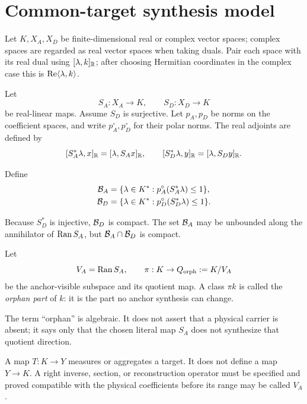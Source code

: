 \section{Common-target synthesis model}
\label{sec:setup}

Let \(K,X_A,X_D\) be finite-dimensional real or complex vector spaces;
complex spaces are regarded as real vector spaces when taking duals.
Pair each space with its real dual using \([\lambda,k]_{\mathbb R}\); after
choosing Hermitian coordinates in the complex case this is
\(\operatorname{Re}\langle\lambda,k\rangle\).

Let
\[
 S_A:X_A\to K,
 \qquad
 S_D:X_D\to K
\]
be real-linear maps.  Assume \(S_D\) is surjective.  Let \(p_A,p_D\)
be norms on the coefficient spaces, and write \(p_A^\circ,p_D^\circ\)
for their polar norms.  The real adjoints are defined by
\[
 [S_A^*\lambda,x]_{\mathbb R}=[\lambda,S_Ax]_{\mathbb R},
 \qquad
 [S_D^*\lambda,y]_{\mathbb R}=[\lambda,S_Dy]_{\mathbb R}.
\]

\begin{definition}\label{def:balls}
Define
\begin{align}
 \mathcal B_A
 &=
 \{\lambda\in K^*:p_A^\circ(S_A^*\lambda)\le1\},
 \label{eq:BA}\\
 \mathcal B_D
 &=
 \{\lambda\in K^*:p_D^\circ(S_D^*\lambda)\le1\}.
 \label{eq:BD}
\end{align}
\end{definition}

Because \(S_D^*\) is injective, \(\mathcal B_D\) is compact.  The set
\(\mathcal B_A\) may be unbounded along the annihilator of \(\operatorname{Ran} S_A\), but
\(\mathcal B_A\cap\mathcal B_D\) is compact.

\begin{definition}\label{def:orphan}
Let
\[
 V_A=\operatorname{Ran} S_A,
 \qquad
 \pi:K\to Q_{\rm orph}:=K/V_A
\]
be the anchor-visible subspace and its quotient map.  A class
\(\pi k\) is called the \emph{orphan part} of \(k\): it is the part no
anchor synthesis can change.
\end{definition}

The term ``orphan'' is algebraic.  It does not assert that a physical
carrier is absent; it says only that the chosen literal map \(S_A\)
does not synthesize that quotient direction.

\begin{remark}\label{rem:obs}
A map \(T:K\to Y\) measures or aggregates a target.  It does not define
a map \(Y\to K\).  A right inverse, section, or reconstruction operator
must be specified and proved compatible with the physical coefficients
before its range may be called \(V_A\).
\end{remark}
